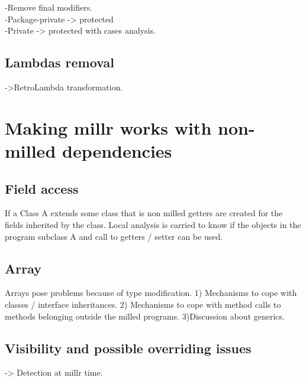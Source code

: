 \documentclass[a4paper, 11pt, english]{article}
\begin{document}
-Remove final modifiers.\\
-Package-private -> protected\\
-Private -> protected with cases analysis.

\subsection{Lambdas removal}
->RetroLambda transformation.

\section{Making millr works with non-milled dependencies}


\subsection{Field access}
If a Class A extends some class that is non milled getters are created for the fields inherited by the class. Local analysis is carried to know if the objects in the program subclass A and call to getters / setter can be used. 

\subsection{Array}
Arrays pose problems because of type modification.
1) Mechanisms to cope with classes / interface inheritances.
2) Mechanisms to cope with method calls to methods belonging outside the milled programs.
3)Discussion about generics.

\subsection{Visibility and possible overriding issues}
-> Detection at millr time.



  
\printbibliography


  
\end{document}
